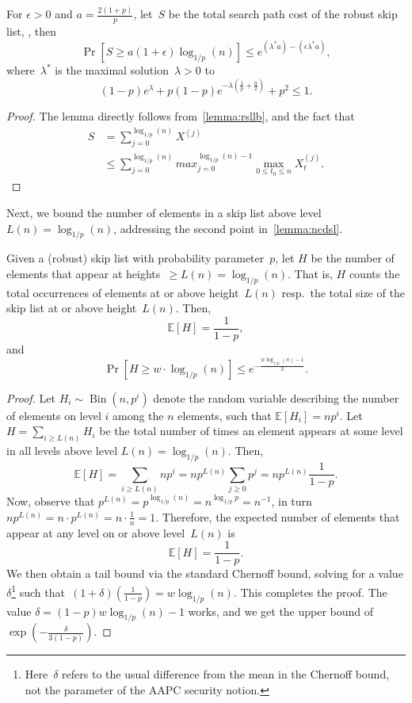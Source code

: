 \begin{lemma}\label{lemma:rslspc}
 For $\epsilon>0$ and $a=\frac{2(1+p)}{p}$, let~$S$ be the total search path cost of the robust skip list, , then \[\Pr[S \geq a(1+\epsilon) \log_{1/p}(n)]  \leq e^{(\lambda^{*}a) - (\epsilon\lambda^{*}a)},\]
 where~$\lambda^{*}$ is the maximal solution~$\lambda > 0$ to
 $$(1-p)e^{\lambda} + p(1-p)e^{-\lambda \left(\frac{1}{p} + \frac{a}{2} \right)} + p^2 \leq 1 .$$
\end{lemma}

\begin{proof}
The lemma directly follows from~\cref{lemma:rsllb}, and the fact that
\begin{align*}
    S &= \sum_{j=0}^{\log_{1/p}(n)} X^{(j)} \\
      &\leq \sum_{j=0}^{\log_{1/p}(n)} max_{j=0}^{\log_{1/p}(n)-1} \underset{0 \leq t_0 \leq n}{\max} X_t^{(j)}.
\end{align*}
\end{proof}

Next, we bound the number of elements in a skip list above level~$L(n) = \log_{1/p}(n)$, addressing the second point in~\cref{lemma:ncdsl}. 

\begin{lemma}\label{lemma:lvlbound}
    Given a (robust) skip list with probability parameter~$p$, let $H$ be the number of elements that appear at heights~$\geq L(n) = \log_{1/p}(n)$. That is, $H$ counts the total occurrences of elements at or above height~$L(n)$ resp.~the total size of the skip list at or above height~$L(n)$. Then,
    \[ \mathbb{E}[H] = \frac{1}{1-p}, \]
    and
    \[ \Pr\left[H \geq w \cdot \log_{1/p}(n)\right] \leq e^{-\frac{w\log_{1/p}(n)-1}{3}}. \]
\end{lemma}

\begin{proof}
    Let $H_i\sim \operatorname{Bin}(n,p^i)$ denote the random variable describing the number of elements on level $i$ among the $n$ elements, such that $\mathbb{E}[H_i]=np^i$.
    Let $H = \sum_{i \ge L(n)} H_i$ be the total number of times an element appears at some level in all levels above level $L(n) = \log_{1/p}(n)$. Then,
    \[ \mathbb{E}[H] = \sum_{i \ge L(n)} np^{i} = np^{L(n)} \sum_{j \geq 0} p^{j} = np^{L(n) } \frac{1}{1-p}. \]
    Now, observe that $p^{L(n)} = p^{\log_{1/p}(n)} = n^{\log_{1/p} p} = n^{-1}$, in turn $np^{L(n) } = n \cdot p^{L(n)} = n \cdot \frac{1}{n}  = 1$. Therefore, the expected number of elements that appear at any level on or above level~$L(n)$ is
    \[ \mathbb{E}[H] = \frac{1}{1-p}. \]
    We then obtain a tail bound via the standard Chernoff bound, solving for a value $\delta$\footnote{Here~$\delta$ refers to the usual difference from the mean in the Chernoff bound, not the parameter of the AAPC security notion.} such that~$(1+\delta)\left(\frac{1}{1-p}\right) = w \log_{1/p}(n)$. This completes the proof. The value $\delta=(1-p)w\log_{1/p}(n)-1$ works, and we get the upper bound of $\exp\left(-\frac{\delta}{3(1-p)}\right)$.
\end{proof}

